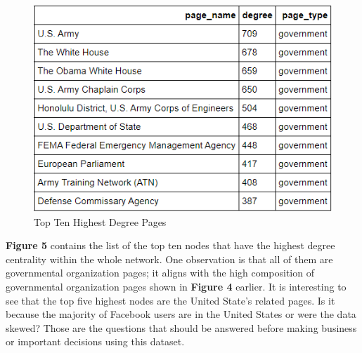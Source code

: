\documentclass[11pt,twocolumn]{article}
\begin{document}
\begin{figure}[hbt!]
\includegraphics[scale=0.5]{top_ten_degree.png} 
\caption{Top Ten Highest Degree Pages}
\end{figure}

\textbf{Figure 5} contains the list of the top ten nodes that have the highest degree centrality within the whole network. One observation is that all of them are governmental organization pages; it aligns with the high composition of governmental organization pages shown in \textbf{Figure 4} earlier. It is interesting to see that the top five highest nodes are the United State's related pages. Is it because the majority of Facebook users are in the United States or were the data skewed? Those are the questions that should be answered before making business or important decisions using this dataset.
\end{document}
